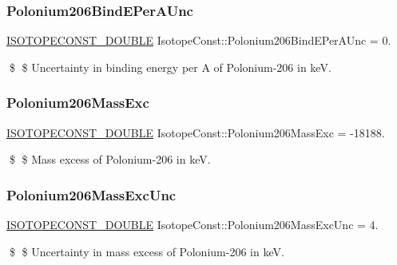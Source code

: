 \subsubsection{\texorpdfstring{Polonium206\+Bind\+E\+Per\+A\+Unc}{Polonium206BindEPerAUnc}}
{\footnotesize\ttfamily \mbox{\hyperlink{group___isotope_const-_macros_ga8f45a7272ce02c0b4c65c44636ed719a}{I\+S\+O\+T\+O\+P\+E\+C\+O\+N\+S\+T\+\_\+\+D\+O\+U\+B\+LE}} Isotope\+Const\+::\+Polonium206\+Bind\+E\+Per\+A\+Unc = 0.}

\$ \$ Uncertainty in binding energy per A of Polonium-\/206 in keV. \mbox{\label{group___isotope_const-_polonium-_po206_ga45f1c42a96062895a19ca94b795f943a}} 
\subsubsection{\texorpdfstring{Polonium206\+Mass\+Exc}{Polonium206MassExc}}
{\footnotesize\ttfamily \mbox{\hyperlink{group___isotope_const-_macros_ga8f45a7272ce02c0b4c65c44636ed719a}{I\+S\+O\+T\+O\+P\+E\+C\+O\+N\+S\+T\+\_\+\+D\+O\+U\+B\+LE}} Isotope\+Const\+::\+Polonium206\+Mass\+Exc = -\/18188.}

\$ \$ Mass excess of Polonium-\/206 in keV. \mbox{\label{group___isotope_const-_polonium-_po206_ga07661ee0cfcaf969befd171186f9909a}} 
\subsubsection{\texorpdfstring{Polonium206\+Mass\+Exc\+Unc}{Polonium206MassExcUnc}}
{\footnotesize\ttfamily \mbox{\hyperlink{group___isotope_const-_macros_ga8f45a7272ce02c0b4c65c44636ed719a}{I\+S\+O\+T\+O\+P\+E\+C\+O\+N\+S\+T\+\_\+\+D\+O\+U\+B\+LE}} Isotope\+Const\+::\+Polonium206\+Mass\+Exc\+Unc = 4.}

\$ \$ Uncertainty in mass excess of Polonium-\/206 in keV. \mbox{\label{group___isotope_const-_polonium-_po206_ga271199186efeaaab6ef0471e99c22c46}} 
